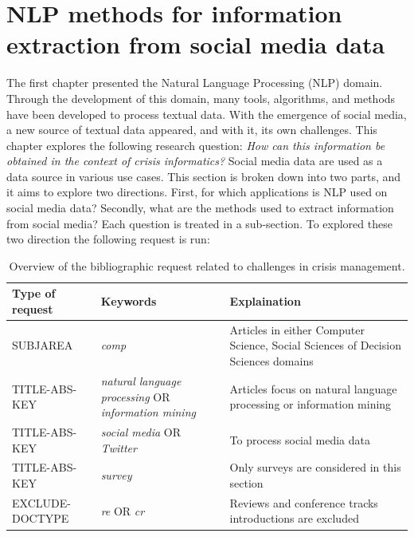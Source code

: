 \section{NLP methods for information extraction from social media data}
The first chapter presented the Natural Language Processing (NLP) domain.
Through the development of this domain, many tools, algorithms, and methods have been developed to process textual data.
With the emergence of social media, a new source of textual data appeared, and with it, its own challenges.
This chapter explores the following research question: \emph{How can this information be obtained in the context of crisis informatics?}
Social media data are used as a data source in various use cases.
This section is broken down into two parts, and it aims to explore two directions.
First, for which applications is NLP used on social media data?
Secondly, what are the methods used to extract information from social media?
Each question is treated in a sub-section.
To explored these two direction the following request is run:

\begin{table}[bht]
    \centering
    \tabulinesep=1.2mm
    \caption{Overview of the bibliographic request related to challenges in crisis management.}
    \begin{tabu} to \textwidth {X[0.5,r]X[1,m]X[1,m]}
        Type of request & Keywords                                                            & Explaination                                                                      \\ [0.5ex]
        \toprule
        SUBJAREA        & \textit{comp}                                                       & Articles in either Computer Science, Social Sciences of Decision Sciences domains \\
        TITLE-ABS-KEY   & \textit{natural language processing} OR \textit{information mining} & Articles focus on natural language processing or information mining               \\
        TITLE-ABS-KEY   & \textit{social media} OR \textit{Twitter}                           & To process social media data                                                      \\
        TITLE-ABS-KEY   & \textit{survey}                                                     & Only surveys are considered in this section                                       \\
        EXCLUDE-DOCTYPE & \textit{re} OR \textit{cr}                                          & Reviews and conference tracks introductions are excluded                          \\
        \bottomrule
    \end{tabu}
    \label{table:nlp-challenges}
\end{table}

